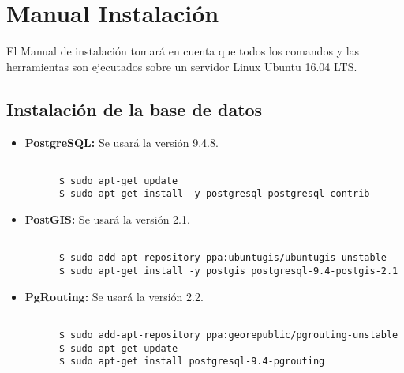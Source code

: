 
\chapter{Manual Instalación}

El Manual de instalación tomará en cuenta que todos los comandos y las herramientas son ejecutados sobre un servidor Linux Ubuntu 16.04 LTS.

\section{Instalación de la base de datos}


\begin{itemize}
  \item \textbf{PostgreSQL:} Se usará la versión 9.4.8.

  \begin{center}
    \begin{lstlisting}[label=postgres_install,caption=Comandos usados para instalar PostgreSQL.]

      $ sudo apt-get update
      $ sudo apt-get install -y postgresql postgresql-contrib
    \end{lstlisting}
  \end{center}

  \item \textbf{PostGIS:} Se usará la versión 2.1.

  \begin{center}
    \begin{lstlisting}[label=postgis_install,caption=Comandos usados para instalar PostGIS.]

      $ sudo add-apt-repository ppa:ubuntugis/ubuntugis-unstable
      $ sudo apt-get install -y postgis postgresql-9.4-postgis-2.1
    \end{lstlisting}
  \end{center}

  \item \textbf{PgRouting:} Se usará la versión 2.2.

  \begin{center}
    \begin{lstlisting}[label=pgRouting_install,caption=Comandos usados para instalar PgRouting.]

      $ sudo add-apt-repository ppa:georepublic/pgrouting-unstable
      $ sudo apt-get update
      $ sudo apt-get install postgresql-9.4-pgrouting
    \end{lstlisting}
  \end{center}




\end{itemize}


